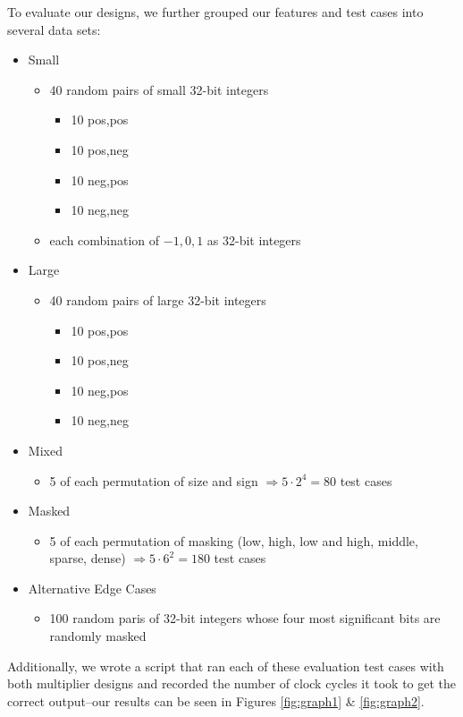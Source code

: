 \documentclass[10pt]{article}
\begin{document}
	To evaluate our designs, we further grouped our features and test cases into several data sets:
	\begin{itemize}
		\item Small
		\begin{itemize}
			\item 40 random pairs of small 32-bit integers
			\begin{itemize}
				\item 10 pos,pos
				\item 10 pos,neg
				\item 10 neg,pos
				\item 10 neg,neg
			\end{itemize}
			\item each combination of $-1,0,1$ as 32-bit integers
		\end{itemize}
		\item Large
		\begin{itemize}
			\item 40 random pairs of large 32-bit integers
			\begin{itemize}
				\item 10 pos,pos
				\item 10 pos,neg
				\item 10 neg,pos
				\item 10 neg,neg
			\end{itemize}
		\end{itemize}
		\item Mixed
		\begin{itemize}
			\item 5 of each permutation of size and sign $\Longrightarrow 5\cdot2^4=80$ test cases
		\end{itemize}
		\item Masked
		\begin{itemize}
			\item 5 of each permutation of masking (low, high, low and high, middle, sparse, dense) $\Longrightarrow 5\cdot6^2=180$ test cases
		\end{itemize}
		\item Alternative Edge Cases
		\begin{itemize}
			\item 100 random paris of 32-bit integers whose four most significant bits are randomly masked
		\end{itemize}
	\end{itemize}

	\noindent Additionally, we wrote a script that ran each of these evaluation test cases with both multiplier designs and recorded the number of clock cycles it took to get the correct output--our results can be seen in Figures \ref{fig:graph1} \& \ref{fig:graph2}.
\end{document}

